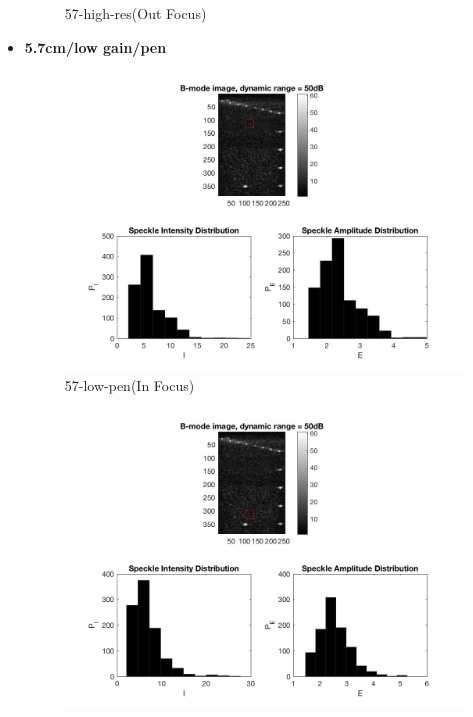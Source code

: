 \documentclass[12pts,a4paper]{article}
\begin{document}
\begin{itemize}
\begin{figure}[h]
    \caption{57-high-res(Out Focus)}
    \label{fig:mesh1}
\end{figure}
\pagebreak
\item{\textbf{5.7cm/low gain/pen}}
\begin{center}
\end{center}
\begin{figure}[h]
    \centering
    \includegraphics[width=1.0\textwidth]{img_hw2/57-low-pen1.jpg}
    \caption{57-low-pen(In Focus)}
    \label{fig:mesh1}
\end{figure}
\pagebreak
\begin{figure}[h]
    \centering
    \includegraphics[width=1.0\textwidth]{img_hw2/57-low-pen2.jpg}

\end{figure}
\end{itemize}
\end{document}
